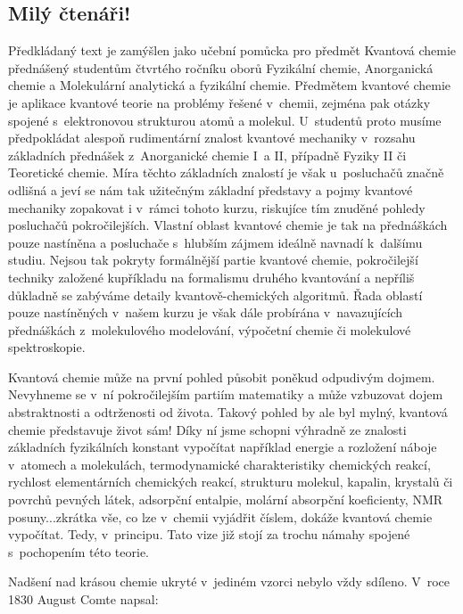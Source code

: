 \subsection{Milý čtenáři!}
Předkládaný text je zamýšlen jako učební pomůcka pro předmět Kvantová chemie přednášený studentům čtvrtého ročníku oborů Fyzikální chemie, Anorganická chemie a Molekulární analytická a fyzikální chemie. Předmětem kvantové chemie je aplikace kvantové teorie na problémy řešené v~chemii, zejména pak otázky spojené s~elektronovou strukturou atomů a molekul. U~studentů proto musíme předpokládat alespoň rudimentární znalost kvantové mechaniky v~rozsahu základních přednášek z~Anorganické chemie I~a II, případně Fyziky II či Teoretické chemie. Míra těchto základních znalostí je však u~posluchačů značně odlišná a jeví se nám tak užitečným základní představy a pojmy kvantové mechaniky zopakovat i v~rámci tohoto kurzu, riskujíce tím znuděné pohledy posluchačů pokročilejších. Vlastní oblast kvantové chemie je tak na přednáškách pouze nastíněna a posluchače s~hlubším zájmem ideálně navnadí k~dalšímu studiu. Nejsou tak pokryty formálnější partie kvantové chemie, pokročilejší techniky založené kupříkladu na formalismu druhého kvantování a nepříliš důkladně se zabýváme detaily kvantově-chemických algoritmů. Řada oblastí pouze nastíněných v~našem kurzu je však dále probírána v~navazujících přednáškách z~molekulového modelování, výpočetní chemie či molekulové spektroskopie.

Kvantová chemie může na první pohled působit poněkud odpudivým dojmem. Nevyhneme se v~ní pokročilejším partiím matematiky a může vzbuzovat dojem abstraktnosti a odtrženosti od života. Takový pohled by ale byl mylný, kvantová chemie představuje život sám! Díky ní jsme schopni výhradně ze znalosti základních fyzikálních konstant vypočítat například energie a rozložení náboje v~atomech a molekulách, termodynamické charakteristiky chemických reakcí, rychlost elementárních chemických reakcí, strukturu molekul, kapalin, krystalů či povrchů pevných látek, adsorpční entalpie, molární absorpční koeficienty, NMR posuny...zkrátka vše, co lze v~chemii vyjádřit číslem, dokáže kvantová chemie vypočítat. Tedy, v~principu. Tato vize již stojí za trochu námahy spojené s~pochopením této teorie. 

Nadšení nad krásou chemie ukryté v~jediném vzorci nebylo vždy sdíleno. V~roce 1830 August Comte napsal:

\bigskip


